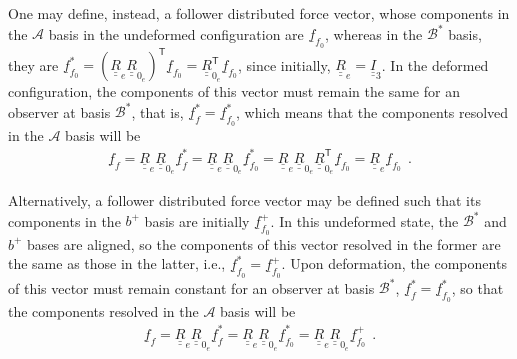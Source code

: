 \documentclass[12pt,a4paper,oneside,english]{abntex2} %
\newcommand{\vect}[1]{\underline{#1}}
\def\tens#1{\underline{\underline{#1}}}
\def\lp{\left(}
\def\rp{\right)}
\def\T{\mathsf{T}}
\def\A{\mathcal{A}}
\def\bp{b^+}
\def\B*{\mathcal{B}^*}
\def\Ithree{\tens{I}_3}
\def\R{\tens{R}}
\def\f{\vect{f}}
\def\Re{\R_{e}}
\def\Rze{\R_{0_e}}
\def\RzeT{\R_{0_e}^\T}
\begin{document}
\begin{apendicesenv}
One may define, instead, a follower distributed force vector, whose components in the $\A$ basis in the undeformed configuration are $\f_{f_0}$, whereas in the $\B*$ basis, they are $\f_{f_0}^* = \lp\Re\Rze\rp^\T\f_{f_0} = \RzeT\f_{f_0}$, since initially, $\Re = \Ithree$. In the deformed configuration, the components of this vector must remain the same for an observer at basis $\B*$, that is, $\f_f^*=\f_{f_0}^*$, which means that the components resolved in the $\A$ basis will be
\begin{align}
    \f_f = \Re\Rze\f_f^* = \Re\Rze\f_{f_0}^* = \Re\Rze\RzeT\f_{f_0} = \Re\f_{f_0} \ \ .
    \label{eq:ffs}
\end{align}

Alternatively, a follower distributed force vector may be defined such that its components in the $\bp$ basis are initially $\f_{f_0}^+$. In this undeformed state, the $\B*$ and $\bp$ bases are aligned, so the components of this vector resolved in the former are the same as those in the latter, i.e., $\f_{f_0}^*=\f_{f_0}^+$. Upon deformation, the components of this vector must remain constant for an observer at basis $\B*$, $\f_{f}^* = \f_{f_0}^*$, so that the components resolved in the $\A$ basis will be
\begin{align}
    \f_f = \Re\Rze\f_{f}^* = \Re\Rze\f_{f_0}^* = \Re\Rze\f_{f_0}^+ \ \ .
    \label{eq:ffp}
\end{align}


\end{apendicesenv}
\end{document}
